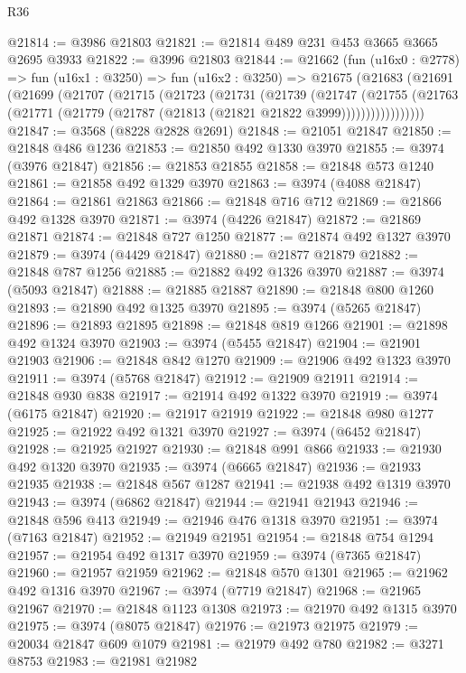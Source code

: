 \begin{lexlean}{R36}
\begin{coremodule}
@21814 := @3986 @21803
@21821 := @21814 @489 @231 @453 @3665 @3665 @2695 @3933
@21822 := @3996 @21803
@21844 := @21662
    (fun (u16x0 : @2778) =>
    fun (u16x1 : @3250) =>
    fun (u16x2 : @3250) =>
    @21675
      (@21683
        (@21691
          (@21699
            (@21707
              (@21715
                (@21723
                  (@21731
                    (@21739
                      (@21747
                        (@21755
                          (@21763
                            (@21771 (@21779 (@21787 (@21813 (@21821 @21822 @3999)))))))))))))))))
@21847 := @3568 (@8228 @2828 @2691)
@21848 := @21051 @21847
@21850 := @21848 @486 @1236
@21853 := @21850 @492 @1330 @3970
@21855 := @3974 (@3976 @21847)
@21856 := @21853 @21855
@21858 := @21848 @573 @1240
@21861 := @21858 @492 @1329 @3970
@21863 := @3974 (@4088 @21847)
@21864 := @21861 @21863
@21866 := @21848 @716 @712
@21869 := @21866 @492 @1328 @3970
@21871 := @3974 (@4226 @21847)
@21872 := @21869 @21871
@21874 := @21848 @727 @1250
@21877 := @21874 @492 @1327 @3970
@21879 := @3974 (@4429 @21847)
@21880 := @21877 @21879
@21882 := @21848 @787 @1256
@21885 := @21882 @492 @1326 @3970
@21887 := @3974 (@5093 @21847)
@21888 := @21885 @21887
@21890 := @21848 @800 @1260
@21893 := @21890 @492 @1325 @3970
@21895 := @3974 (@5265 @21847)
@21896 := @21893 @21895
@21898 := @21848 @819 @1266
@21901 := @21898 @492 @1324 @3970
@21903 := @3974 (@5455 @21847)
@21904 := @21901 @21903
@21906 := @21848 @842 @1270
@21909 := @21906 @492 @1323 @3970
@21911 := @3974 (@5768 @21847)
@21912 := @21909 @21911
@21914 := @21848 @930 @838
@21917 := @21914 @492 @1322 @3970
@21919 := @3974 (@6175 @21847)
@21920 := @21917 @21919
@21922 := @21848 @980 @1277
@21925 := @21922 @492 @1321 @3970
@21927 := @3974 (@6452 @21847)
@21928 := @21925 @21927
@21930 := @21848 @991 @866
@21933 := @21930 @492 @1320 @3970
@21935 := @3974 (@6665 @21847)
@21936 := @21933 @21935
@21938 := @21848 @567 @1287
@21941 := @21938 @492 @1319 @3970
@21943 := @3974 (@6862 @21847)
@21944 := @21941 @21943
@21946 := @21848 @596 @413
@21949 := @21946 @476 @1318 @3970
@21951 := @3974 (@7163 @21847)
@21952 := @21949 @21951
@21954 := @21848 @754 @1294
@21957 := @21954 @492 @1317 @3970
@21959 := @3974 (@7365 @21847)
@21960 := @21957 @21959
@21962 := @21848 @570 @1301
@21965 := @21962 @492 @1316 @3970
@21967 := @3974 (@7719 @21847)
@21968 := @21965 @21967
@21970 := @21848 @1123 @1308
@21973 := @21970 @492 @1315 @3970
@21975 := @3974 (@8075 @21847)
@21976 := @21973 @21975
@21979 := @20034 @21847 @609 @1079
@21981 := @21979 @492 @780
@21982 := @3271 @8753
@21983 := @21981 @21982

\end{coremodule}
\end{lexlean}
